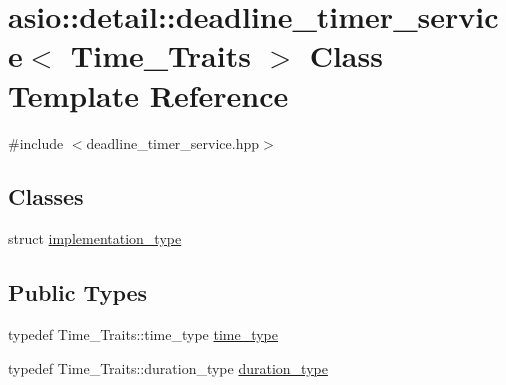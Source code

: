 \hypertarget{classasio_1_1detail_1_1deadline__timer__service}{}\section{asio\+:\+:detail\+:\+:deadline\+\_\+timer\+\_\+service$<$ Time\+\_\+\+Traits $>$ Class Template Reference}
\label{classasio_1_1detail_1_1deadline__timer__service}


{\ttfamily \#include $<$deadline\+\_\+timer\+\_\+service.\+hpp$>$}

\subsection*{Classes}
\begin{DoxyCompactItemize}
\item 
struct \hyperlink{structasio_1_1detail_1_1deadline__timer__service_1_1implementation__type}{implementation\+\_\+type}
\end{DoxyCompactItemize}
\subsection*{Public Types}
\begin{DoxyCompactItemize}
\item 
typedef Time\+\_\+\+Traits\+::time\+\_\+type \hyperlink{classasio_1_1detail_1_1deadline__timer__service_a217817497abe6136c056c0facdd3f8aa}{time\+\_\+type}
\item 
typedef Time\+\_\+\+Traits\+::duration\+\_\+type \hyperlink{classasio_1_1detail_1_1deadline__timer__service_aa2f42592b15216b94578b059efa9b304}{duration\+\_\+type}
\end{DoxyCompactItemize}
